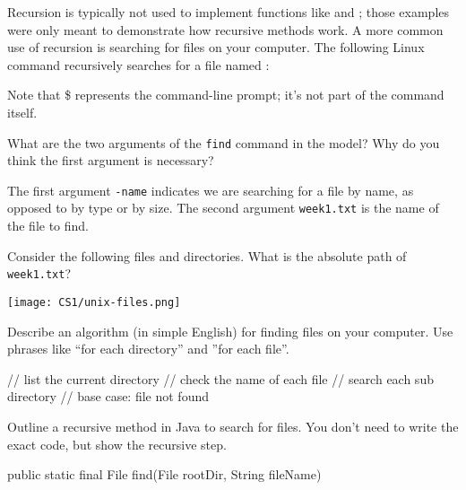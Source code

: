 
Recursion is typically not used to implement functions like  and ; those examples were only meant to demonstrate how recursive methods work.
A more common use of recursion is searching for files on your computer.
The following Linux command recursively searches for a file named :

\vspace{1em}
\vspace{1em}

Note that \$ represents the command-line prompt; it's not part of the command itself.




\Q What are the two arguments of the \texttt{find} command in the model?
Why do you think the first argument is necessary?

\begin{answer}
The first argument \texttt{-name} indicates we are searching for a file by name, as opposed to by type or by size. The second argument \texttt{week1.txt} is the name of the file to find.
\end{answer}


\Q Consider the following files and directories.
What is the absolute path of \texttt{week1.txt}?

\begin{center}
\texttt{[image: CS1/unix-files.png]}
\end{center}


\Q Describe an algorithm (in simple English) for finding files on your computer.
Use phrases like ``for each directory'' and ''for each file''.

\begin{answer}
// list the current directory
// check the name of each file
// search each sub directory
// base case: file not found
\end{answer}


\Q Outline a recursive method in Java to search for files.
You don't need to write the exact code, but show the recursive step.

\begin{javalst}
public static final File find(File rootDir, String fileName) {












}
\end{javalst}
